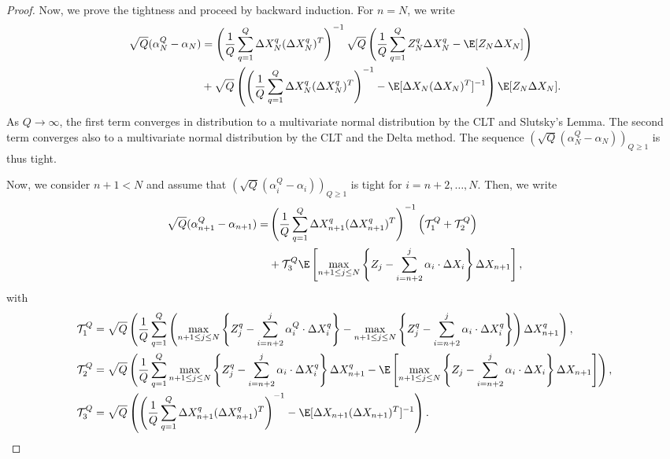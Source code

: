 \begin{proof}
Now, we prove the tightness and proceed by backward induction. For $n=N$, we write
\begin{align*}
  \sqrt{Q}(\alpha_N^Q - \alpha_N) &=  \left( \frac 1 Q \sum_{q=1}^Q \Delta X^q_{N} (\Delta X^q_{N})^T \right)^{-1}  \sqrt{Q}\left( \frac 1 Q \sum_{q=1}^Q Z^q_{N} \Delta X^q_{N} - \E[Z_{N} \Delta X_N] \right) \\
  &+ \sqrt{Q}\left( \left(\frac 1 Q \sum_{q=1}^Q \Delta X^q_{N} (\Delta X^q_{N})^T \right)^{-1} -\E[\Delta X_{N} (\Delta X_{N})^T]^{-1}\right)\E[Z_{N} \Delta X_N].
\end{align*}
As $Q\to \infty$, the first term converges in distribution to a multivariate normal distribution by the CLT and Slutsky's Lemma. The second term converges also to a multivariate normal distribution by the CLT and the Delta method. The sequence $\left(\sqrt{Q}(\alpha_N^Q - \alpha_N)\right)_{Q\ge 1}$ is thus tight. 


Now, we consider $n+1<N$ and assume that $ \left(\sqrt{Q}(\alpha_i^Q - \alpha_i)\right)_{Q\ge 1} $ is tight for $i=n+2,\dots,N$. Then, we write 
\begin{align*}
  \sqrt{Q}(\alpha_{n+1}^Q - \alpha_{n+1}) =  &\left( \frac 1 Q \sum_{q=1}^Q \Delta X^q_{n+1} (\Delta X^q_{n+1})^T \right)^{-1}  \left(\mathcal{T}^Q_1 +\mathcal{T}^Q_2\right) \\
  &   +\mathcal{T}^Q_3 \E\left[ \max_{n + 1\le j \le N} \left\{ Z_{j} - \sum_{i=n+2}^{j} \alpha_i \cdot \Delta X_i \right\}  \Delta X_{n+1}\right],
\end{align*}
with
{\footnotesize
\begin{align*}
  \mathcal{T}^Q_1&=\sqrt{Q}\left( \frac 1 Q \sum_{q=1}^Q \left( \max_{n + 1\le j \le N} \left\{ Z^q_{j} - \sum_{i=n+2}^{j} \alpha^Q_i \cdot \Delta X^q_i \right\}  -\max_{n + 1\le j \le N} \left\{ Z^q_{j} - \sum_{i=n+2}^{j} \alpha_i \cdot \Delta X^q_i \right\} \right)\Delta X^q_{n+1}    \right), \\
  \mathcal{T}^Q_2&=\sqrt{Q}\left( \frac 1 Q \sum_{q=1}^Q \max_{n + 1\le j \le N} \left\{ Z^q_{j} - \sum_{i=n+2}^{j} \alpha_i \cdot \Delta X^q_i \right\} \Delta X^q_{n+1}   - \E\left[ \max_{n + 1\le j \le N} \left\{ Z_{j} - \sum_{i=n+2}^{j} \alpha_i \cdot \Delta X_i \right\}  \Delta X_{n+1}\right]  \right), \\
  \mathcal{T}^Q_3&=\sqrt{Q} \left( \left(\frac 1 Q \sum_{q=1}^Q \Delta X^q_{n+1} (\Delta X^q_{n+1})^T \right)^{-1} -\E[\Delta X_{n+1} (\Delta X_{n+1})^T]^{-1}\right).
\end{align*}
}


\end{proof}
